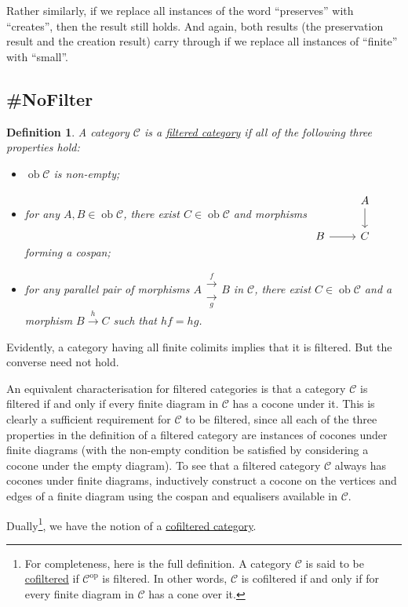 \documentclass[a4paper,11pt]{article}
\theoremstyle{break_italics}
\newtheorem*{definition*}{Definition}
\theoremstyle{break_upright}
\theoremstyle{remark}
\newcommand{\ob}{\operatorname{ob}}
\newcommand{\C}{\mathcal{C}}
\newcommand{\op}{\mathrm{op}}
\begin{document}
Rather similarly, if we replace all instances of the word ``preserves'' with ``creates'', then the result still holds. And again, both results (the preservation result and the creation result) carry through if we replace all instances of ``finite'' with ``small''.








\subsection{\#NoFilter}

\begin{definition*}
A category $\C$ is a \uline{filtered category} if all of the following three properties hold:
\begin{itemize}
	\item $\ob\C$ is non-empty;
	\item for any $A,B \in \ob\C$, there exist $C \in \ob\C$ and morphisms $\begin{tikzcd}
	& A \\
	B & C
	\arrow[from=1-2, to=2-2]
	\arrow[from=2-1, to=2-2]
\end{tikzcd}$ forming a cospan;
	\item for any parallel pair of morphisms $A \substack{\xrightarrow{f} \\ \xrightarrow[g]{}} B$ in $\C$, there exist $C \in\ob\C$ and a morphism $B \xrightarrow{h} C$ such that $hf = hg$.
\end{itemize}
\end{definition*}

Evidently, a category having all finite colimits implies that it is filtered. But the converse need not hold.

An equivalent characterisation for filtered categories is that a category $\C$ is filtered if and only if every finite diagram in $\C$ has a cocone under it. This is clearly a sufficient requirement for $\C$ to be filtered, since all each of the three properties in the definition of a filtered category are instances of cocones under finite diagrams (with the non-empty condition be satisfied by considering a cocone under the empty diagram). To see that a filtered category $\C$ always has cocones under finite diagrams, inductively construct a cocone on the vertices and edges of a finite diagram using the cospan and equalisers available in $\C$.

Dually\footnote{For completeness, here is the full definition. A category $\C$ is said to be \uline{cofiltered} if $\C^\op$ is filtered. In other words, $\C$ is cofiltered if and only if for every finite diagram in $\C$ has a cone over it.}, we have the notion of a \uline{cofiltered category}.
\end{document}
